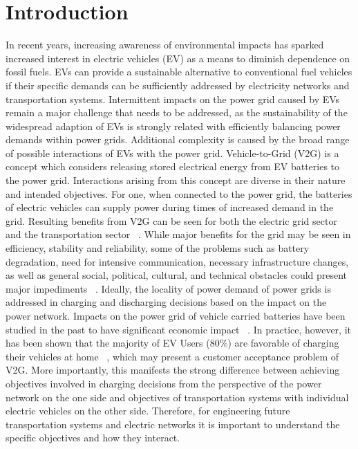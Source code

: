 \section{Introduction}

In recent years, increasing awareness of environmental impacts has sparked increased interest in electric vehicles (EV) as a means to diminish dependence on fossil fuels. EVs can provide a sustainable alternative to conventional fuel vehicles if their specific demands can be sufficiently addressed by electricity networks and transportation systems.
Intermittent impacts on the power grid caused by EVs remain a major challenge that needs to be addressed, as the sustainability of the widespread adaption of EVs is strongly related with efficiently balancing power demands within power grids. Additional complexity is caused by the broad range of possible interactions of EVs with the power grid. Vehicle-to-Grid (V2G) is a concept which considers releasing stored electrical energy from EV batteries to the power grid. Interactions arising from this concept are diverse in their nature and intended objectives. For one, when connected to the power grid, the batteries of electric vehicles can supply power during times of increased demand in the grid. Resulting benefits from V2G can be seen for both the electric grid sector and the transportation sector ~\cite{tomic2007using}. While major benefits for the grid may be seen in efficiency, stability and reliability, some of the problems such as battery degradation, need for intensive communication, necessary infrastructure changes, as well as general social, political, cultural, and technical obstacles could present major impediments ~\cite{yilmaz2013review}. Ideally, the locality of power demand of power grids is addressed in charging and discharging decisions based on the impact on the power network. Impacts on the power grid of vehicle carried batteries have been studied in the past to have significant economic impact ~\cite{peterson2010economics,erdinc2014economic}. In practice, however, it has been shown that the majority of EV Users (80\%) are favorable of charging their vehicles at home ~\cite{haines2009simulation}, which may present a customer acceptance problem of V2G. More importantly, this manifests the strong difference between achieving objectives involved in charging decisions from the perspective of the power network on the one side and objectives of transportation systems with individual electric vehicles on the other side. Therefore, for engineering future transportation systems and electric networks it is important to understand the specific objectives and how they interact.

